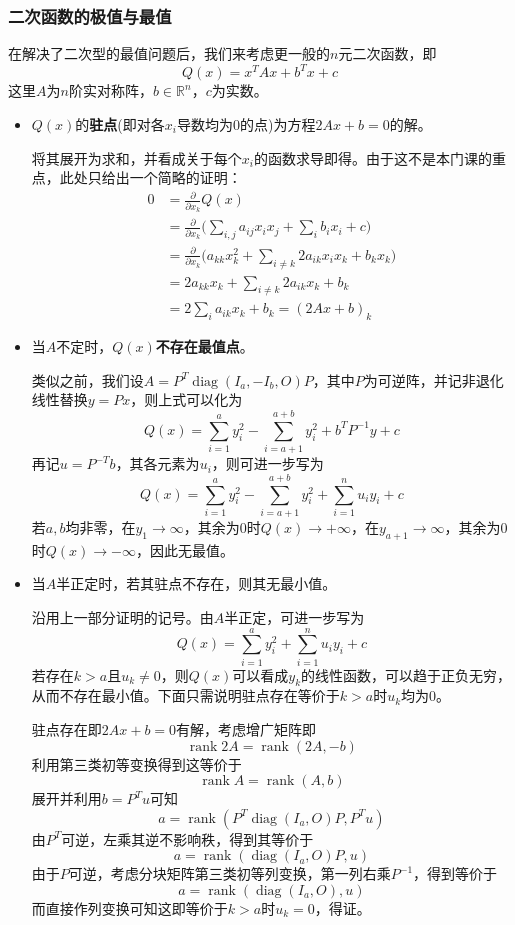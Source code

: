 \documentclass[a4paper,UTF8,fontset=windows]{ctexart}
\DeclareMathOperator{\diag}{diag}
\DeclareMathOperator{\rank}{rank}
\begin{document}
\subsubsection{二次函数的极值与最值}
在解决了二次型的最值问题后，我们来考虑更一般的$n$元二次函数，即
$$Q(x)=x^TAx+b^Tx+c$$
这里$A$为$n$阶实对称阵，$b\in\mathbb{R}^n$，$c$为实数。

\begin{itemize}
    \item $Q(x)$的\textbf{驻点}(即对各$x_i$导数均为0的点)为方程$2Ax+b=0$的解。

    将其展开为求和，并看成关于每个$x_i$的函数求导即得。由于这不是本门课的重点，此处只给出一个简略的证明：
    $$\begin{aligned}0 &=\frac{\partial}{\partial x_k}Q(x)\\ &=\frac{\partial}{\partial x_k}\bigg(\sum_{i,j}a_{ij}x_ix_j+\sum_ib_ix_i+c\bigg)\\ &=\frac{\partial}{\partial x_k}\bigg(a_{kk}x_k^2+\sum_{i\ne k}2a_{ik}x_ix_k+b_kx_k\bigg)\\ &=2a_{kk}x_k+\sum_{i\ne k}2a_{ik}x_k+b_k\\ &=2\sum_ia_{ik}x_k+b_k=(2Ax+b)_k\end{aligned}$$

    \item 当$A$不定时，$Q(x)$\textbf{不存在最值点}。
    
    类似之前，我们设$A=P^T\diag(I_a,-I_b,O)P$，其中$P$为可逆阵，并记非退化线性替换$y=Px$，则上式可以化为
    $$Q(x)=\sum_{i=1}^ay_i^2-\sum_{i=a+1}^{a+b}y_i^2+b^TP^{-1}y+c$$
    再记$u=P^{-T}b$，其各元素为$u_i$，则可进一步写为
    $$Q(x)=\sum_{i=1}^ay_i^2-\sum_{i=a+1}^{a+b}y_i^2+\sum_{i=1}^nu_iy_i+c$$
    若$a,b$均非零，在$y_1\to\infty$，其余为0时$Q(x)\to+\infty$，在$y_{a+1}\to\infty$，其余为0时$Q(x)\to-\infty$，因此无最值。

    \item 当$A$半正定时，若其驻点不存在，则其无最小值。
    
    沿用上一部分证明的记号。由$A$半正定，可进一步写为
    $$Q(x)=\sum_{i=1}^ay_i^2+\sum_{i=1}^nu_iy_i+c$$
    若存在$k>a$且$u_k\ne0$，则$Q(x)$可以看成$y_k$的线性函数，可以趋于正负无穷，从而不存在最小值。下面只需说明驻点存在等价于$k>a$时$u_k$均为0。

    驻点存在即$2Ax+b=0$有解，考虑增广矩阵即
    $$\rank 2A=\rank(2A,-b)$$
    利用第三类初等变换得到这等价于
    $$\rank A=\rank(A,b)$$
    展开并利用$b=P^Tu$可知
    $$a=\rank(P^T\diag(I_a,O)P,P^Tu)$$
    由$P^T$可逆，左乘其逆不影响秩，得到其等价于
    $$a=\rank(\diag(I_a,O)P,u)$$
    由于$P$可逆，考虑分块矩阵第三类初等列变换，第一列右乘$P^{-1}$，得到等价于
    $$a=\rank(\diag(I_a,O),u)$$
    而直接作列变换可知这即等价于$k>a$时$u_k=0$，得证。
    

\end{itemize}
\end{document}
